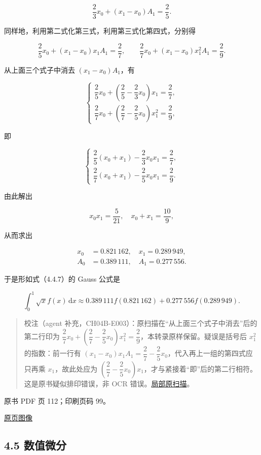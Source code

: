 \[
\frac23x_0+(x_1-x_0)A_1=\frac25.
\]

同样地，利用第二式化第三式，利用第三式化第四式，分别得

\[
\frac25x_0+(x_1-x_0)x_1A_1=\frac27,\qquad
\frac27x_0+(x_1-x_0)x_1^2A_1=\frac29.
\]

从上面三个式子中消去 \((x_1-x_0)A_1\)，有

\[
\begin{cases}
\dfrac25x_0+\left(\dfrac25-\dfrac23x_0\right)x_1=\dfrac27,\\[5pt]
\dfrac27x_0+\left(\dfrac27-\dfrac25x_0\right)x_1^2=\dfrac29,
\end{cases}
\]

即

\[
\begin{cases}
\dfrac25(x_0+x_1)-\dfrac23x_0x_1=\dfrac27,\\[5pt]
\dfrac27(x_0+x_1)-\dfrac25x_0x_1=\dfrac29.
\end{cases}
\]

由此解出

\[
x_0x_1=\frac5{21},\quad x_0+x_1=\frac{10}9,
\]

从而求出

\[
\begin{aligned}
x_0&=0.821\,162,\quad x_1=0.289\,949,\\
A_0&=0.389\,111,\quad A_1=0.277\,556.
\end{aligned}
\]

于是形如式（4.4.7）的 Gauss 公式是

\[
\int_0^1\sqrt{x}f(x)\,\mathrm{d}x
\approx0.389\,111f(0.821\,162)+0.277\,556f(0.289\,949).
\]

\begin{quote}
校注（agent 补充，CH04B-E003）：原扫描在``从上面三个式子中消去''后的第二行印为 \(\dfrac27x_0+\left(\dfrac27-\dfrac25x_0\right)x_1^2=\dfrac29\)，本转录原样保留。疑误是括号后 \(x_1^2\) 的指数：前一行有 \((x_1-x_0)x_1A_1=\dfrac27-\dfrac25x_0\)，代入再上一组的第四式应只再乘 \(x_1\)，故此处应为 \(\left(\dfrac27-\dfrac25x_0\right)x_1\)，才与紧接着``即''后的第二行相符。这是原书疑似排印错误，非 OCR 错误。\href{verified/assets/ch04b/review-p111-elimination.png}{局部原扫描}。
\end{quote}

\clearpage

原书 PDF 页 112；印刷页码 99。

\href{source-images/pdf-112.jpeg}{原页图像}

\subsection{4.5 数值微分}\label{ch04b-ux6570ux503cux5faeux5206}

